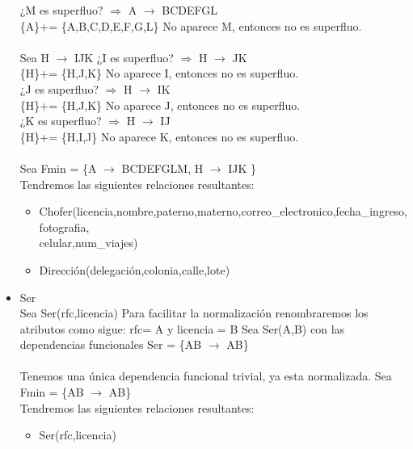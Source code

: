 \documentclass{article}
\begin{document}
\begin{itemize}
¿M es superfluo? $\Rightarrow$ A $\rightarrow$ BCDEFGL \\
\{A\}+= \{A,B,C,D,E,F,G,L\}  No aparece M, entonces no es superfluo.\\
\\
Sea H $\rightarrow$ IJK 
¿I es superfluo? $\Rightarrow$ H $\rightarrow$ JK \\
\{H\}+= \{H,J,K\} No aparece I, entonces no es superfluo.\\
¿J es superfluo? $\Rightarrow$ H $\rightarrow$ IK \\
\{H\}+= \{H,J,K\} No aparece J, entonces no es superfluo.\\
¿K es superfluo? $\Rightarrow$ H $\rightarrow$ IJ \\
\{H\}+= \{H,I,J\} No aparece K, entonces no es superfluo.\\
\\
Sea Fmin = \{A $\rightarrow$ BCDEFGLM, H $\rightarrow$ IJK  \}\\
Tendremos las siguientes relaciones resultantes:
\begin{itemize}
\item Chofer(licencia,nombre,paterno,materno,correo\_electronico,fecha\_ingreso,fotografia,\\ celular,num\_viajes)
\item Dirección(delegación,colonia,calle,lote)
\end{itemize}

\item Ser\\
Sea Ser(rfc,licencia)
Para facilitar la normalización renombraremos los atributos como sigue:
rfc= A y licencia = B
Sea Ser(A,B) con las dependencias funcionales 
Ser = \{AB $\rightarrow$ AB\} \\
\\
Tenemos una única dependencia funcional trivial, ya esta normalizada.
Sea Fmin = \{AB $\rightarrow$ AB\} \\
Tendremos las siguientes relaciones resultantes:
\begin{itemize}
\item Ser(rfc,licencia)
\end{itemize}



\end{itemize}
\end{document}
